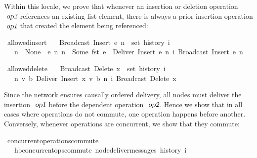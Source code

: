 Within this locale, we prove that whenever an insertion or deletion operation $\isa{op2}$ references an existing list element, there is always a prior insertion operation $\isa{op1}$ that created the element being referenced:
\begin{isabelle}
\ allowed{\isacharunderscore}insert{\isacharcolon}\isanewline
\ \ \ {\isachardoublequoteopen}Broadcast\ {\isacharparenleft}Insert\ e\ n{\isacharparenright}\ {\isasymin}\ set\ {\isacharparenleft}history\ i{\isacharparenright}{\isachardoublequoteclose}\isanewline
\ \ \ {\isachardoublequoteopen}n\ {\isacharequal}\ None\ {\isasymor}\ {\isacharparenleft}{\isasymexists}e{\isacharprime}\ n{\isacharprime}{\isachardot}\ n\ {\isacharequal}\ Some\ {\isacharparenleft}fst\ e{\isacharprime}{\isacharparenright}\ {\isasymand}\ Deliver\ {\isacharparenleft}Insert\ e{\isacharprime}\ n{\isacharprime}{\isacharparenright}\ {\isasymsqsubset}\isactrlsup i\ Broadcast\ {\isacharparenleft}Insert\ e\ n{\isacharparenright}{\isacharparenright}{\isachardoublequoteclose}
\end{isabelle}
\begin{isabelle}
\ allowed{\isacharunderscore}delete{\isacharcolon}\isanewline
\ \ \ {\isachardoublequoteopen}Broadcast\ {\isacharparenleft}Delete\ x{\isacharparenright}\ {\isasymin}\ set\ {\isacharparenleft}history\ i{\isacharparenright}{\isachardoublequoteclose}\isanewline
\ \ \ {\isachardoublequoteopen}{\isasymexists}n{\isacharprime}\ v\ b{\isachardot}\ Deliver\ {\isacharparenleft}Insert\ {\isacharparenleft}x{\isacharcomma}\ v{\isacharcomma}\ b{\isacharparenright}\ n{\isacharprime}{\isacharparenright}\ {\isasymsqsubset}\isactrlsup i\ Broadcast\ {\isacharparenleft}Delete\ x{\isacharparenright}{\isachardoublequoteclose}
\end{isabelle}
Since the network ensures causally ordered delivery, all nodes must deliver the insertion $\isa{op1}$ before the dependent operation $\isa{op2}$.
Hence we show that in all cases where operations do not commute, one operation happens before another.
Conversely, whenever operations are concurrent, we show that they commute:
\begin{isabelle}
\ concurrent{\isacharunderscore}operations{\isacharunderscore}commute{\isacharcolon}\isanewline
\ \ \ {\isachardoublequoteopen}hb{\isachardot}concurrent{\isacharunderscore}ops{\isacharunderscore}commute\ {\isacharparenleft}node{\isacharunderscore}deliver{\isacharunderscore}messages\ {\isacharparenleft}history\ i{\isacharparenright}{\isacharparenright}{\isachardoublequoteclose}
\end{isabelle}
